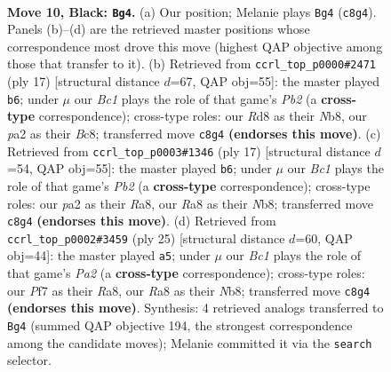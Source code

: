 \documentclass[11pt]{article}
\begin{document}
\clearpage

\begin{figure}[p]\centering
\begin{subfigure}{0.46\textwidth}\centering
\resizebox{\linewidth}{!}{%
\newchessgame
\chessboard[
  setfen={rnbr2k1/pp3pbp/2p2np1/4p3/1P2P2P/2N2N2/P1P1BPP1/R1B2RK1 b - - 0 10},
  showmover=false,
  pgfstyle=straightmove, color=movearrow, markmove={c8-g4}
]}
\caption{}
\end{subfigure}\hfill
\begin{subfigure}{0.46\textwidth}\centering
\resizebox{\linewidth}{!}{%
\newchessgame
\chessboard[
  setfen={rnbr2k1/ppp2pbp/5np1/4p3/2P1P3/2N1BN1P/PP3PP1/R3KB1R b KQ - 1 9},
  showmover=false,
  pgfstyle=straightmove, color=movearrow, markmove={b7-b6}
]}
\caption{}
\end{subfigure}
\\[4pt]
\begin{subfigure}{0.46\textwidth}\centering
\resizebox{\linewidth}{!}{%
\newchessgame
\chessboard[
  setfen={rnbr2k1/ppp2pbp/5np1/4p3/2P1P3/2N2N1P/PP2BPP1/R1B1K2R b KQ - 1 9},
  showmover=false,
  pgfstyle=straightmove, color=movearrow, markmove={b7-b6}
]}
\caption{}
\end{subfigure}\hfill
\begin{subfigure}{0.46\textwidth}\centering
\resizebox{\linewidth}{!}{%
\newchessgame
\chessboard[
  setfen={rn2r1k1/pp3pb1/2p2np1/4pb1p/2P5/BPN2NPP/P2RPPB1/R5K1 b - - 1 13},
  showmover=false,
  pgfstyle=straightmove, color=movearrow, markmove={a7-a5}
]}
\caption{}
\end{subfigure}
\caption{\textbf{Move 10, Black: \texttt{Bg4}.} (a) Our position; Melanie plays \texttt{Bg4} (\texttt{c8g4}). Panels (b)--(d) are the retrieved master positions whose correspondence most drove this move (highest QAP objective among those that transfer to it). (b) Retrieved from \texttt{ccrl\_top\_p0000\#2471} (ply 17) [structural distance $d$=67, QAP obj=55]: the master played \texttt{b6}; under $\mu$ our \emph{Bc1} plays the role of that game's \emph{Pb2} (a \textbf{cross-type} correspondence); cross-type roles: our \emph{R}d8 as their \emph{N}b8, our \emph{p}a2 as their \emph{B}c8; transferred move \texttt{c8g4} \textbf{(endorses this move)}. (c) Retrieved from \texttt{ccrl\_top\_p0003\#1346} (ply 17) [structural distance $d$=54, QAP obj=55]: the master played \texttt{b6}; under $\mu$ our \emph{Bc1} plays the role of that game's \emph{Pb2} (a \textbf{cross-type} correspondence); cross-type roles: our \emph{p}a2 as their \emph{R}a8, our \emph{R}a8 as their \emph{N}b8; transferred move \texttt{c8g4} \textbf{(endorses this move)}. (d) Retrieved from \texttt{ccrl\_top\_p0002\#3459} (ply 25) [structural distance $d$=60, QAP obj=44]: the master played \texttt{a5}; under $\mu$ our \emph{Bc1} plays the role of that game's \emph{Pa2} (a \textbf{cross-type} correspondence); cross-type roles: our \emph{P}f7 as their \emph{R}a8, our \emph{R}a8 as their \emph{N}b8; transferred move \texttt{c8g4} \textbf{(endorses this move)}. Synthesis: 4 retrieved analogs transferred to \texttt{Bg4} (summed QAP objective 194, the strongest correspondence among the candidate moves); Melanie committed it via the \texttt{search} selector.}
\label{fig:thought-m19}
\end{figure}
\end{document}
